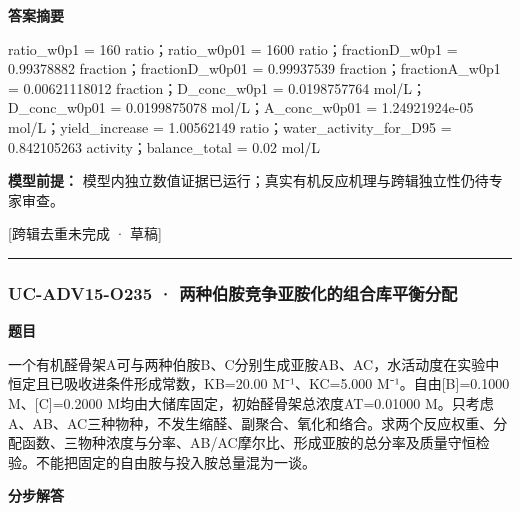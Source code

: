 \documentclass[UTF8,11pt,a4paper]{ctexart}
\begin{document}
\noindent\textbf{答案摘要}\par
ratio\_w0p1 = 160 ratio；ratio\_w0p01 = 1600 ratio；fractionD\_w0p1 = 0.99378882 fraction；fractionD\_w0p01 = 0.99937539 fraction；fractionA\_w0p1 = 0.00621118012 fraction；D\_conc\_w0p1 = 0.0198757764 mol/L；D\_conc\_w0p01 = 0.0199875078 mol/L；A\_conc\_w0p01 = 1.24921924e-05 mol/L；yield\_increase = 1.00562149 ratio；water\_activity\_for\_D95 = 0.842105263 activity；balance\_total = 0.02 mol/L\par
\noindent\textbf{模型前提：}
模型内独立数值证据已运行；真实有机反应机理与跨辑独立性仍待专家审查。\par
\noindent\textcolor{red!65!black}{[跨辑去重未完成 · 草稿]} \par
\medskip\hrule\medskip
{}
\subsubsection*{UC-ADV15-O235 · 两种伯胺竞争亚胺化的组合库平衡分配}
\noindent\textbf{题目}\par
一个有机醛骨架A可与两种伯胺B、C分别生成亚胺AB、AC，水活动度在实验中恒定且已吸收进条件形成常数，KB=20.00 M⁻¹、KC=5.000 M⁻¹。自由[B]=0.1000 M、[C]=0.2000 M均由大储库固定，初始醛骨架总浓度AT=0.01000 M。只考虑A、AB、AC三种物种，不发生缩醛、副聚合、氧化和络合。求两个反应权重、分配函数、三物种浓度与分率、AB/AC摩尔比、形成亚胺的总分率及质量守恒检验。不能把固定的自由胺与投入胺总量混为一谈。\par
\medskip\noindent\textbf{分步解答}
\end{document}
